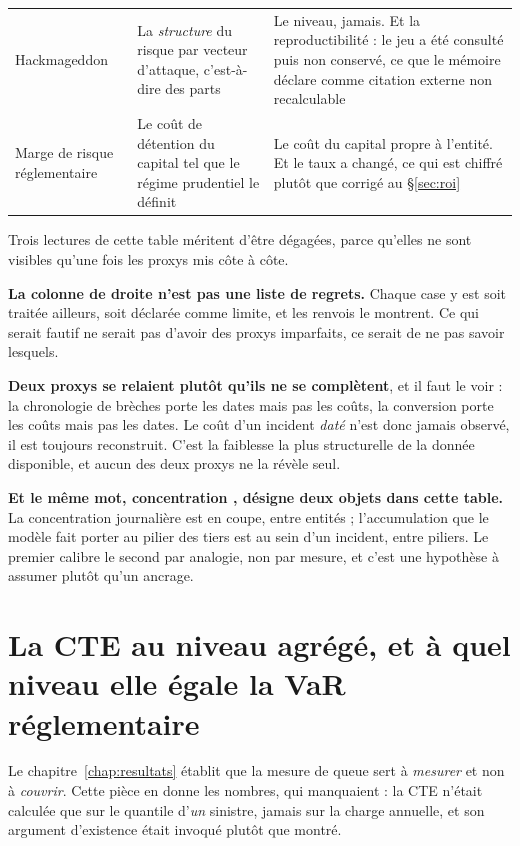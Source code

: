 {\begin{longtable}{@{}>{\raggedright\arraybackslash}p{3.1cm}
                    >{\raggedright\arraybackslash}p{5.4cm}
                    >{\raggedright\arraybackslash}p{5.6cm}@{}}
Hackmageddon &
La \emph{structure} du risque par vecteur d'attaque, c'est-à-dire des parts &
Le niveau, jamais. Et la reproductibilité : le jeu a été consulté puis non conservé, ce que le
mémoire déclare comme citation externe non recalculable \\

Marge de risque réglementaire &
Le coût de détention du capital tel que le régime prudentiel le définit &
Le coût du capital propre à l'entité. Et le taux a changé, ce qui est chiffré plutôt que
corrigé au \S\ref{sec:roi} \\
\end{longtable}
}

\vspace{0.2cm}
\noindent Trois lectures de cette table méritent d'être dégagées, parce qu'elles ne sont visibles
qu'une fois les proxys mis côte à côte.

\textbf{La colonne de droite n'est pas une liste de regrets.} Chaque case y est soit traitée
ailleurs, soit déclarée comme limite, et les renvois le montrent. Ce qui serait fautif ne serait
pas d'avoir des proxys imparfaits, ce serait de ne pas savoir lesquels.

\textbf{Deux proxys se relaient plutôt qu'ils ne se complètent}, et il faut le voir : la
chronologie de brèches porte les dates mais pas les coûts, la conversion porte les coûts mais pas
les dates. Le coût d'un incident \emph{daté} n'est donc jamais observé, il est toujours
reconstruit. C'est la faiblesse la plus structurelle de la donnée disponible, et aucun des deux
proxys ne la révèle seul.

\textbf{Et le même mot, \og concentration \fg{}, désigne deux objets dans cette table.} La concentration
journalière est en coupe, entre entités ; l'accumulation que le modèle fait porter au pilier des
tiers est au sein d'un incident, entre piliers. Le premier calibre le second par analogie, non par
mesure, et c'est une hypothèse à assumer plutôt qu'un ancrage.


\section{La CTE au niveau agrégé, et à quel niveau elle égale la VaR réglementaire}
\label{sec:ann-cte}


Le chapitre~\ref{chap:resultats} établit que la mesure de queue sert à \emph{mesurer} et non à
\emph{couvrir}. Cette pièce en donne les nombres, qui manquaient : la CTE n'était calculée que sur
le quantile d'\emph{un} sinistre, jamais sur la charge annuelle, et son argument d'existence était
invoqué plutôt que montré.

